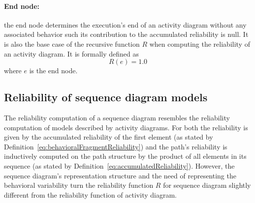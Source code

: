 \paragraph{End node:}
the end node determines the execution's end of an activity diagram without any
associated behavior such its contribution to the accumulated reliability is null.
It is also the base case of the recursive function $R$ when computing the
reliability of an activity diagram. It is formally defined as \begin{equation}
	\label{eq:endNodeReliability} R(e) = 1.0 \end{equation} where $e$ is the
end node.



\subsection{Reliability of sequence diagram models
	\label{sec:reliabilityOfSequenceDiagramModels}}

The reliability computation of a sequence diagram resembles the reliability
computation of models described by activity diagrams.  For both the reliability
is given by the accumulated reliability of the first element (as stated by
Definition~\ref{eq:behavioralFragmentReliability}) and the path's
reliability is inductively computed on the path structure by the product of all
elements in its sequence (as stated by Definition~\ref{eq:accumulatedReliability}). However, the sequence diagram's representation
structure and the need of representing the behavioral variability turn the
reliability function $R$ for sequence diagram slightly different from the
reliability function of activity diagram.

